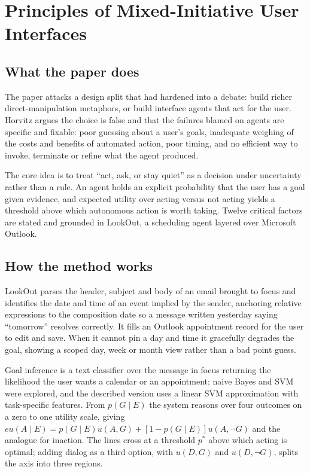 \section{Principles of Mixed-Initiative User Interfaces}

\subsection{What the paper does}

The paper attacks a design split that had hardened into a debate: build richer direct-manipulation metaphors, or build interface agents that act for the user. Horvitz argues the choice is false and that the failures blamed on agents are specific and fixable: poor guessing about a user's goals, inadequate weighing of the costs and benefits of automated action, poor timing, and no efficient way to invoke, terminate or refine what the agent produced.

The core idea is to treat ``act, ask, or stay quiet'' as a decision under uncertainty rather than a rule. An agent holds an explicit probability that the user has a goal given evidence, and expected utility over acting versus not acting yields a threshold above which autonomous action is worth taking. Twelve critical factors are stated and grounded in LookOut, a scheduling agent layered over Microsoft Outlook.

\subsection{How the method works}

LookOut parses the header, subject and body of an email brought to focus and identifies the date and time of an event implied by the sender, anchoring relative expressions to the composition date so a message written yesterday saying ``tomorrow'' resolves correctly. It fills an Outlook appointment record for the user to edit and save. When it cannot pin a day and time it gracefully degrades the goal, showing a scoped day, week or month view rather than a bad point guess.

Goal inference is a text classifier over the message in focus returning the likelihood the user wants a calendar or an appointment; naive Bayes and SVM were explored, and the described version uses a linear SVM approximation with task-specific features. From $p(G \mid E)$ the system reasons over four outcomes on a zero to one utility scale, giving $eu(A \mid E) = p(G \mid E)u(A,G) + [1 - p(G \mid E)]u(A,\neg G)$ and the analogue for inaction. The lines cross at a threshold $p^{*}$ above which acting is optimal; adding dialog as a third option, with $u(D,G)$ and $u(D,\neg G)$, splits the axis into three regions.

